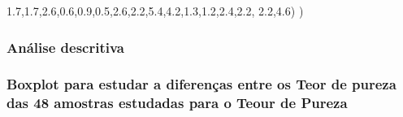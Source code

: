 \documentclass[
  letterpaper,
  DIV=11,
  numbers=noendperiod]{scrartcl}
\newenvironment{Shaded}{\begin{snugshade}}{\end{snugshade}}
\newcommand{\FloatTok}[1]{\textcolor[rgb]{0.68,0.00,0.00}{#1}}
\newcommand{\NormalTok}[1]{\textcolor[rgb]{0.00,0.23,0.31}{#1}}
\begin{document}
\begin{Shaded}
\begin{Highlighting}[]
                      \FloatTok{1.7}\NormalTok{,}\FloatTok{1.7}\NormalTok{,}\FloatTok{2.6}\NormalTok{,}\FloatTok{0.6}\NormalTok{,}\FloatTok{0.9}\NormalTok{,}\FloatTok{0.5}\NormalTok{,}\FloatTok{2.6}\NormalTok{,}\FloatTok{2.2}\NormalTok{,}\FloatTok{5.4}\NormalTok{,}\FloatTok{4.2}\NormalTok{,}\FloatTok{1.3}\NormalTok{,}\FloatTok{1.2}\NormalTok{,}\FloatTok{2.4}\NormalTok{,}\FloatTok{2.2}\NormalTok{,}
                      \FloatTok{2.2}\NormalTok{,}\FloatTok{4.6}\NormalTok{)}
\NormalTok{)}
\end{Highlighting}
\end{Shaded}

\subsubsection{Análise descritiva}\label{anuxe1lise-descritiva-1}

\subsubsection{Boxplot para estudar a diferenças entre os Teor de pureza
das 48 amostras estudadas para o Teour de
Pureza}\label{boxplot-para-estudar-a-diferenuxe7as-entre-os-teor-de-pureza-das-48-amostras-estudadas-para-o-teour-de-pureza}
\end{document}
